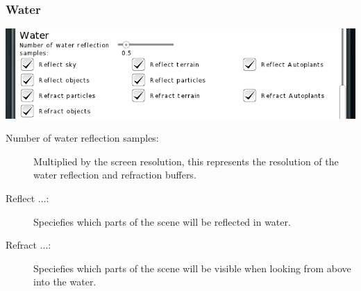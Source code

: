 \documentclass[a4paper]{article}
\begin{document}
\subsubsection{Water}
\includegraphics[width=140mm]{./images/settings-water.png}
\begin{description}
  \item[Number of water reflection samples:] Multiplied by the screen resolution, this represents the resolution of the water reflection and refraction buffers.
  \item[Reflect ...:] Speciefies which parts of the scene will be reflected in water.
  \item[Refract ...:] Speciefies which parts of the scene will be visible when looking from above into the water.
\end{description}
\end{document}
